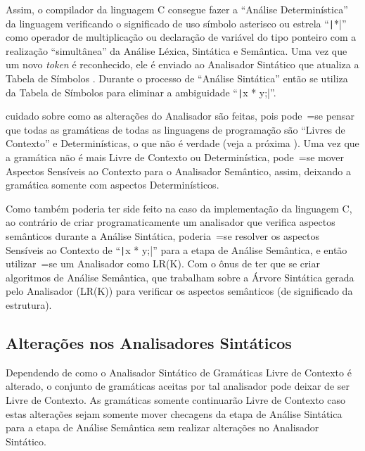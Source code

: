 Assim,
o compilador da linguagem C consegue fazer a ``Análise Determinística'' da linguagem verificando o significado de uso símbolo asterisco ou
estrela ``\texttt|*|'' como operador de multiplicação ou
declaração de variável do tipo ponteiro com a realização ``simultânea'' da Análise Léxica,
Sintática e
Semântica.
Uma vez que um novo \textit{token} é reconhecido,
ele é enviado ao Analisador Sintático que atualiza a Tabela de Símbolos \cite{ahoCompilerDragonBook}.
Durante o processo de ``Análise Sintática'' então se utiliza da Tabela de Símbolos para eliminar a ambiguidade ``\texttt|x * y;|''.

 cuidado sobre como as alterações do Analisador são feitas,
pois pode~=se pensar que todas as gramáticas de todas as linguagens de programação são ``Livres de Contexto'' e
Determinísticas,
o que não é verdade (veja a próxima ).
Uma vez que a gramática não é mais Livre de Contexto ou
Determinística,
pode~=se mover Aspectos Sensíveis ao Contexto para o Analisador Semântico,
assim,
deixando a gramática somente com aspectos Determinísticos.

Como também poderia ter side feito na caso da implementação da linguagem C,
ao contrário de criar programaticamente um analisador que verifica aspectos semânticos durante a Análise Sintática,
poderia~=se resolver os aspectos Sensíveis ao Contexto de ``\texttt|x * y;|'' para a etapa de Análise Semântica,
e então utilizar~=se um Analisador como LR(K).
Com o ônus de ter que se criar algoritmos de Análise Semântica,
que trabalham sobre a Árvore Sintática gerada pelo Analisador (LR(K)) para verificar os aspectos semânticos (de significado da estrutura).


\subsection{Alterações nos Analisadores Sintáticos}
\label{section:alteracoesNosAnalisadoresSintaticos}

Dependendo de como o Analisador Sintático de Gramáticas Livre de Contexto é alterado,
o conjunto de gramáticas aceitas por tal analisador pode deixar de ser Livre de Contexto.
As gramáticas somente continuarão Livre de Contexto caso estas alterações sejam somente mover checagens da etapa de Análise Sintática para a etapa de Análise Semântica sem realizar alterações no Analisador Sintático.

